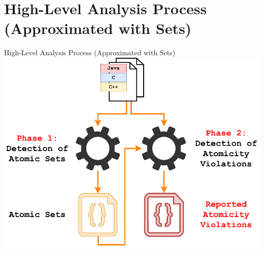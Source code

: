 \documentclass[10pt, xcolor=pdflatex, hyperref={unicode}, aspectratio=169]{beamer}
\begin{document}
\section{High-Level Analysis Process (Approximated with Sets)}
\begin{frame}{High-Level Analysis Process (Approximated with Sets)}
    \centering
    \includegraphics[width=.7 \linewidth]{analyser-proposal-sets.pdf}
\end{frame}


\end{document}
